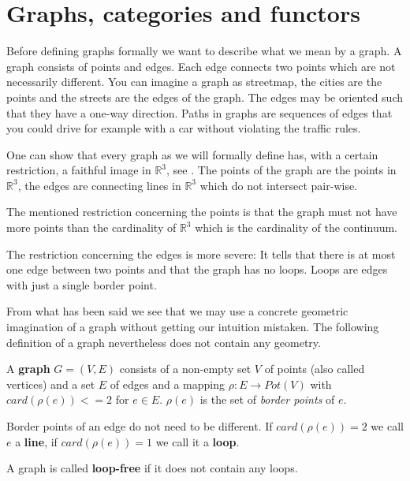 \section{Graphs, categories and functors}

Before defining graphs formally we want to describe what we mean by a graph. A
graph consists of points and edges. Each edge connects two points which are not
necessarily different. You can imagine a graph as streetmap, the cities are the
points and the streets are the edges of the graph. The edges may be oriented
such that they have a one-way direction. Paths in graphs are sequences of edges
that you could drive for example with a car without violating the traffic rules.

One can show that every graph as we will formally define has, with a certain
restriction, a faithful image in $\mathbb{R}^3$, see \cite{Wagner}. The
points of the graph are the points in $\mathbb{R}^3$, the edges are
connecting lines in $\mathbb{R}^3$ which do not intersect pair-wise.

The mentioned restriction concerning the points is that the graph must not have
more points than the cardinality of $\mathbb{R}^3$ which is the cardinality of
the continuum.

The restriction concerning the edges is more severe: It tells that there is at
most one edge between two points and that the graph has no loops. 
Loops are edges with just a single border point.

From what has been said we see that we may use a concrete geometric imagination
of a graph without getting our intuition mistaken. The following definition of a
graph nevertheless does not contain any geometry.

\begin{definition}
A {\bf graph} $G = (V, E)$ consists of a non-empty set $V$ of points (also
called vertices) and a set $E$ of edges and a mapping $\rho: E \to Pot(V)$ with
$card(\rho(e)) <= 2$ for $e \in E$. $\rho(e)$ is the set of {\em border points}
of $e$.
\end{definition}

Border points of an edge do not need to be different. If $card(\rho(e)) = 2$ we
call $e$ a {\bf line}, if $card(\rho(e)) = 1$ we call it a {\bf loop}.

\begin{definition}
A graph is called {\bf loop-free} if it does not contain any loops.
\end{definition}

